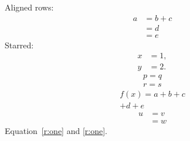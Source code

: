 
Aligned rows:
\begin{align}
a &= b + c \label{r:one}\\
  &= d \nonumber\\
  &= e \tag{A}
\end{align}
Starred:
\begin{align*}
x &= 1,\\
y &= 2.
\end{align*}
\begin{gather}
p = q \\
r = s
\end{gather}
\begin{multline}
f(x) = a + b + c \\
+ d + e
\end{multline}
\begin{equation}
\begin{split}
u &= v \\
  &= w
\end{split}
\end{equation}
Equation~\eqref{r:one} and \eqref{r:one}.

